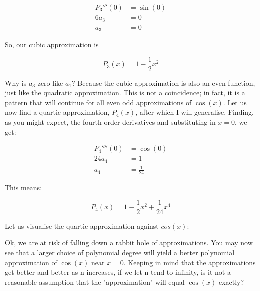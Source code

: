 \documentclass{article}
\begin{document}
\begin{align*}
    P_3'''(0) &= \sin(0) \\
    6a_3 &= 0 \\
    a_3 &= 0
\end{align*}

So, our cubic approximation is

$$
P_3(x) = 1 - \frac{1}{2} x^2
$$

Why is $a_3$ zero like $a_1$? Because the cubic approximation is also an even function, just like the quadratic approximation. This is not a coincidence; in fact, it is a pattern that will continue for all even odd approximations of $\cos(x)$. Let us now find a quartic approximation, $P_4(x)$, after which I will generalise. Finding, as you might expect, the fourth order derivatives and substituting in $x = 0$, we get:

\begin{align*}
    P_4''''(0) &= \cos(0) \\
    24a_4 &= 1 \\
    a_4 &= \frac{1}{24}
\end{align*}

This means:

$$
P_4(x) = 1 - \frac{1}{2} x^2 + \frac{1}{24} x^4
$$

Let us visualise the quartic approximation against $cos(x)$:

\begin{center}
\end{center}

Ok, we are at risk of falling down a rabbit hole of approximations. You may now see that a larger choice of polynomial degree will yield a better polynomial approximation of $\cos(x)$ near $x=0$. Keeping in mind that the approximations get better and better as n increases, if we let n tend to infinity, is it not a reasonable assumption that the "approximation" will equal $\cos(x)$ exactly?
\end{document}
